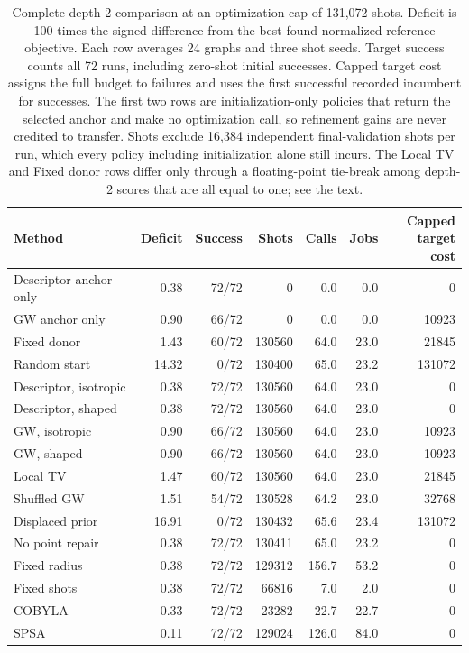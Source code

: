 \begin{table}[t]
\caption{Complete depth-2 comparison at an optimization cap of 131,072 shots. Deficit is 100 times the signed difference from the best-found normalized reference objective. Each row averages 24 graphs and three shot seeds. Target success counts all 72 runs, including zero-shot initial successes. Capped target cost assigns the full budget to failures and uses the first successful recorded incumbent for successes. The first two rows are initialization-only policies that return the selected anchor and make no optimization call, so refinement gains are never credited to transfer. Shots exclude 16,384 independent final-validation shots per run, which every policy including initialization alone still incurs. The Local TV and Fixed donor rows differ only through a floating-point tie-break among depth-2 scores that are all equal to one; see the text.}\label{tab:results}
\centering\small
\setlength{\tabcolsep}{4pt}
\begin{tabular}{lrrrrrr}
\toprule
Method & Deficit & Success & Shots & Calls & Jobs & \shortstack{Capped\\target cost} \\
\midrule
Descriptor anchor only & 0.38 & 72/72 & 0 & 0.0 & 0.0 & 0 \\
GW anchor only & 0.90 & 66/72 & 0 & 0.0 & 0.0 & 10923 \\
\midrule
Fixed donor & 1.43 & 60/72 & 130560 & 64.0 & 23.0 & 21845 \\
Random start & 14.32 & 0/72 & 130400 & 65.0 & 23.2 & 131072 \\
Descriptor, isotropic & 0.38 & 72/72 & 130560 & 64.0 & 23.0 & 0 \\
Descriptor, shaped & 0.38 & 72/72 & 130560 & 64.0 & 23.0 & 0 \\
GW, isotropic & 0.90 & 66/72 & 130560 & 64.0 & 23.0 & 10923 \\
GW, shaped & 0.90 & 66/72 & 130560 & 64.0 & 23.0 & 10923 \\
Local TV & 1.47 & 60/72 & 130560 & 64.0 & 23.0 & 21845 \\
Shuffled GW & 1.51 & 54/72 & 130528 & 64.2 & 23.0 & 32768 \\
Displaced prior & 16.91 & 0/72 & 130432 & 65.6 & 23.4 & 131072 \\
No point repair & 0.38 & 72/72 & 130411 & 65.0 & 23.2 & 0 \\
Fixed radius & 0.38 & 72/72 & 129312 & 156.7 & 53.2 & 0 \\
Fixed shots & 0.38 & 72/72 & 66816 & 7.0 & 2.0 & 0 \\
COBYLA & 0.33 & 72/72 & 23282 & 22.7 & 22.7 & 0 \\
SPSA & 0.11 & 72/72 & 129024 & 126.0 & 84.0 & 0 \\
\bottomrule
\end{tabular}
\end{table}
